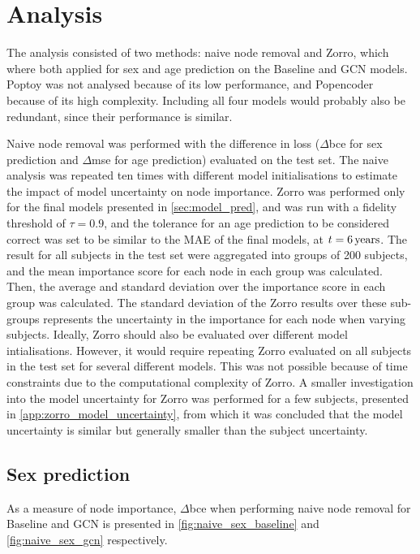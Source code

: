 \section{Analysis}
The analysis consisted of two methods: naive node removal and Zorro, which where both applied for sex and age prediction on the Baseline and GCN models. Poptoy was not analysed because of its low performance, and Popencoder because of its high complexity. Including all four models would probably also be redundant, since their performance is similar. 

Naive node removal was performed with the difference in loss ($\Delta$\acrshort{bce} for sex prediction and $\Delta$\acrshort{mse} for age prediction) evaluated on the test set. The naive analysis was repeated ten times with different model initialisations to estimate the impact of model uncertainty on node importance. Zorro was performed only for the final models presented in \cref{sec:model_pred}, and was run with a fidelity threshold of $\tau=0.9$, and the tolerance for an age prediction to be considered correct was set to be similar to the MAE of the final models, at $t=6\rm\,years$. The result for all subjects in the test set were aggregated into groups of 200 subjects, and the mean importance score for each node in each group was calculated. Then, the average and standard deviation over the importance score in each group was calculated. The standard deviation of the Zorro results over these sub-groups represents the uncertainty in the importance for each node when varying subjects. Ideally, Zorro should also be evaluated over different model intialisations. However, it would require repeating Zorro evaluated on all subjects in the test set for several different models. This was not possible because of time constraints due to the computational complexity of Zorro. A smaller investigation into the model uncertainty for Zorro was performed for a few subjects, presented in \cref{app:zorro_model_uncertainty}, from which it was concluded that the model uncertainty is similar but generally smaller than the subject uncertainty. 

\subsection{Sex prediction}
\label{sec:results_analysis_sex}
As a measure of node importance, $\Delta$\acrshort{bce} when performing naive node removal for Baseline and GCN is presented in \cref{fig:naive_sex_baseline} and \cref{fig:naive_sex_gcn} respectively.

